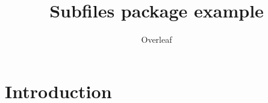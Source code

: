 \documentclass{article}
\title{Subfiles package example}
\author{Overleaf}
\date{ }
\begin{document}
\maketitle

\section{Introduction}




\end{document}
